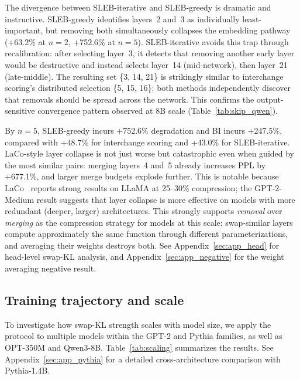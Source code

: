 \documentclass{article}
\begin{document}
The divergence between SLEB-iterative and SLEB-greedy is dramatic and instructive. SLEB-greedy identifies layers~2 and~3 as individually least-important, but removing both simultaneously collapses the embedding pathway (+63.2\% at $n{=}2$, +752.6\% at $n{=}5$). SLEB-iterative avoids this trap through recalibration: after selecting layer~3, it detects that removing another early layer would be destructive and instead selects layer~14 (mid-network), then layer~21 (late-middle). The resulting set \{3, 14, 21\} is strikingly similar to interchange scoring's distributed selection \{5, 15, 16\}: both methods independently discover that removals should be spread across the network. This confirms the output-sensitive convergence pattern observed at 8B scale (Table~\ref{tab:skip_qwen}).

By $n{=}5$, SLEB-greedy incurs +752.6\% degradation and BI incurs +247.5\%, compared with +48.7\% for interchange scoring and +43.0\% for SLEB-iterative. LaCo-style layer collapse is not just worse but catastrophic even when guided by the most similar pairs: merging layers~4 and~5 already increases PPL by +677.1\%, and larger merge budgets explode further. This is notable because LaCo~\citep{yang2024laco} reports strong results on LLaMA at 25--30\% compression; the GPT-2-Medium result suggests that layer collapse is more effective on models with more redundant (deeper, larger) architectures. This strongly supports \emph{removal} over \emph{merging} as the compression strategy for models at this scale: swap-similar layers compute approximately the same function through different parameterizations, and averaging their weights destroys both. See Appendix~\ref{sec:app_head} for head-level swap-KL analysis, and Appendix~\ref{sec:app_negative} for the weight averaging negative result.

\subsection{Training trajectory and scale}
\label{sec:exp_scaling}

To investigate how swap-KL strength scales with model size, we apply the protocol to multiple models within the GPT-2 and Pythia families, as well as OPT-350M and Qwen3-8B. Table~\ref{tab:scaling} summarizes the results. See Appendix~\ref{sec:app_pythia} for a detailed cross-architecture comparison with Pythia-1.4B.
\end{document}

